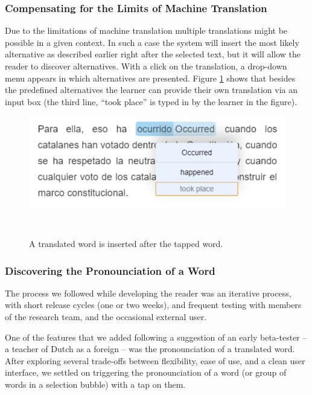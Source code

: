 \subsubsection{Compensating for the Limits of Machine Translation}
Due to the limitations of machine translation multiple translations might be possible in a given context. In such a case the system will insert the most likely alternative as described earlier right after the selected text, but it will allow the reader to discover alternatives. With a click on the translation, a drop-down menu appears in which alternatives are presented. Figure \ref{fig:registrations} shows that besides the predefined alternatives the learner can provide their own translation via an input box (the third line, ``took place'' is typed in by the learner in the figure). 


\begin{figure}[h!]
\centering
  \includegraphics[width=0.7\columnwidth]{figures/translation_alter_menu}
  \caption{A translated word is inserted after the tapped word.}~\label{fig:registrations}
\end{figure}

\subsubsection{Discovering the Pronounciation of a Word}

The process we followed while developing the reader was an iterative process, with short release cycles (one or two weeks), and frequent testing with members of the research team, and the occasional external user. 

One of the features that we added following a suggestion of an early beta-tester -- a teacher of Dutch as a foreign -- was the pronounciation of a translated word. After exploring several trade-offs between flexibility, ease of use, and a clean user interface, we settled on triggering the pronounciation of a word (or group of words in a selection bubble) with a tap on them. 


